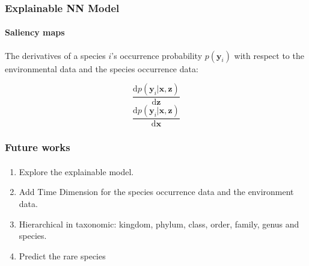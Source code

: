 \documentclass[handout]{beamer}
\begin{document}
\begin{frame}[t]
    \frametitle{Explainable NN Model}
    \framesubtitle{Saliency maps}
    The derivatives of a species $i$'s occurrence probability $p(\bm{y}_i)$ with respect to the environmental data and the species occurrence data:

    \begin{equation}
        \frac{\text{d}p(\bm{y}_i|\bm{x},\bm{z})}{\text{d} \bm{z}}
    \end{equation}
    \begin{equation}
        \frac{\text{d}p(\bm{y}_i|\bm{x},\bm{z})}{\text{d} \bm{x}}   
    \end{equation}
    
\end{frame}


\begin{frame}[t]
    \frametitle{Future works}
    \framesubtitle{}
    \begin{enumerate}
        \item Explore the explainable model.
        \item Add Time Dimension for the species occurrence data and the environment data.
        \item Hierarchical in taxonomic: kingdom, phylum, class, order, family, genus and species.
        \item Predict the rare species
    \end{enumerate}
    
\end{frame}
\end{document}
